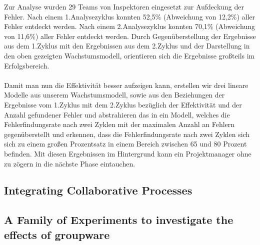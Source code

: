 \documentclass{llncs}
\begin{document}
Zur Analyse wurden 29 Teams von Inspektoren eingesetzt zur Aufdeckung der Fehler. Nach einem 1.Analysezyklus konnten 52,5\% (Abweichung von 12,2\%) aller Fehler entdeckt werden. Nach einem 2.Analysezyklus konnten 70,1\% (Abweichung von 11,6\%) aller Fehler entdeckt werden. Durch Gegenüberstellung der Ergebnisse aus dem 1.Zyklus mit den Ergebnissen aus dem 2.Zyklus und der Darstellung in den oben gezeigten Wachstumsmodell, orientieren sich die Ergebnisse großteils im Erfolgsbereich.
\\ \\
Damit man nun die Effektivität besser aufzeigen kann, erstellen wir drei lineare Modelle aus unserem Wachstumsmodell, sowie aus den Beziehungen der Ergebnisse vom 1.Zyklus mit dem 2.Zyklus bezüglich der Effektivität und der Anzahl gefundener Fehler und abstrahieren das in ein Modell, welches die Fehlerfindungsrate nach zwei Zyklen mit der maximalen Anzahl an Fehlern gegenüberstellt und erkennen, dass die Fehlerfindungsrate nach zwei Zyklen sich sich zu einem großen Prozentsatz in einem Bereich zwischen 65 und 80 Prozent befinden. Mit diesen Ergebnissen im Hintergrund kann ein Projektmanager ohne zu zögern in die nächste Phase eintauchen.


\subsection{Integrating Collaborative Processes}

\subsection{A Family of Experiments to investigate the effects of groupware}
\end{document}
